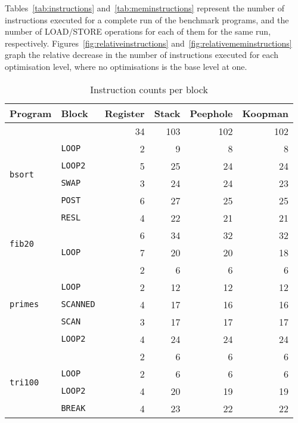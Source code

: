 Tables~\ref{tab:instructions} and~\ref{tab:meminstructions} represent the number
of instructions executed for a complete run of the benchmark programs, and the
number of LOAD/STORE operations for each of them for the same run, respectively.
Figures~\ref{fig:relativeinstructions} and~\ref{fig:relativememinstructions}
graph the relative decrease in the number of instructions executed for each
optimisation level, where no optimisations is the base level at one.

\begin{table}
\begin{tabular}{l l r r r r}
  Program & Block & Register & Stack & Peephole & Koopman \\ \toprule
  \multirow{6}{*}{\texttt{bsort}}  & & 34 & 103 & 102 & 102 \\
  & \texttt{LOOP}                    &  2 &   9 &   8 &   8 \\
  & \texttt{LOOP2}                   &  5 &  25 &  24 &  24 \\
  & \texttt{SWAP}                    &  3 &  24 &  24 &  23 \\
  & \texttt{POST}                    &  6 &  27 &  25 &  25 \\
  & \texttt{RESL}                    &  4 &  22 &  21 &  21 \\ \midrule
  \multirow{2}{*}{\texttt{fib20}}  & &  6 &  34 &  32 &  32 \\
  & \texttt{LOOP}                    &  7 &  20 &  20 &  18 \\ \midrule
  \multirow{5}{*}{\texttt{primes}} & &  2 &   6 &   6 &   6 \\
  & \texttt{LOOP}                    &  2 &  12 &  12 &  12 \\
  & \texttt{SCANNED}                 &  4 &  17 &  16 &  16 \\
  & \texttt{SCAN}                    &  3 &  17 &  17 &  17 \\
  & \texttt{LOOP2}                   &  4 &  24 &  24 &  24 \\ \midrule
  \multirow{5}{*}{\texttt{tri100}} & &  2 &   6 &   6 &   6 \\
  & \texttt{LOOP}                    &  2 &   6 &   6 &   6 \\
  & \texttt{LOOP2}                   &  4 &  20 &  19 &  19 \\
  & \texttt{BREAK}                   &  4 &  23 &  22 &  22 \\
\end{tabular}
\caption{Instruction counts per block}\label{tab:instructionperblock}
\end{table}

